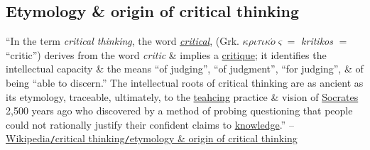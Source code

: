 \documentclass[oneside]{book}
\numberwithin{equation}{section}
\begin{document}
\subsection{Etymology \& origin of critical thinking}
``In the term \textit{critical thinking}, the word \href{https://en.wiktionary.org/wiki/critical}{\textit{critical}}, (Grk. $\kappa\rho\iota\tau\iota\kappa\acute{o}\varsigma =$ \textit{kritikos} $=$ ``critic'') derives from the word \textit{critic} \& implies a \href{https://en.wikipedia.org/wiki/Critique}{critique}; it identifies the intellectual capacity \& the means ``of judging'', ``of judgment'', ``for judging'', \& of being ``able to discern.'' The intellectual roots of critical thinking are as ancient as its etymology, traceable, ultimately, to the \href{https://en.wikipedia.org/wiki/Teachings_and_philosophy_of_Swami_Vivekananda}{teahcing} practice \& vision of \href{https://en.wikipedia.org/wiki/Socrates}{Socrates} 2,500 years ago who discovered by a method of probing questioning that people could not rationally justify their confident claims to \href{https://en.wikipedia.org/wiki/Knowledge}{knowledge}.'' -- \href{https://en.wikipedia.org/wiki/Critical_thinking#Etymology_and_origin_of_critical_thinking}{Wikipedia\texttt{/}critical thinking\texttt{/}etymology \& origin of critical thinking}
\end{document}
